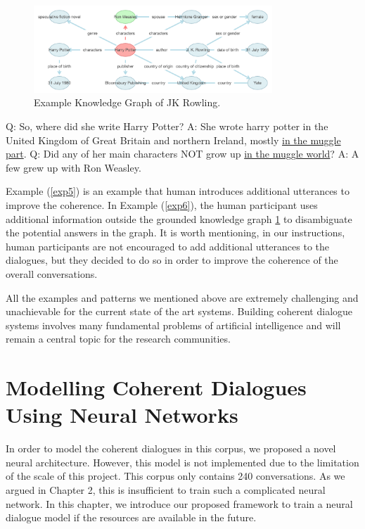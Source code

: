 \documentclass[bsc,frontabs,twoside,singlespacing,parskip,deptreport]{infthesis}     %
\begin{document}
\begin{figure}[h]
    \centering
    \includegraphics[width=0.8\textwidth]{jk.png}
    \caption{Example Knowledge Graph of JK Rowling.}
    \label{fig:jk}
\end{figure}


\begin{exe}
	\ex
	\label{exp6}
		\begin{xlist}
			\ex \label{exp3q1} Q: So, where did she write Harry Potter?
			\ex \label{exp3a1} A: She wrote harry potter in the United Kingdom of Great Britain and northern Ireland, mostly \underline{in the muggle part}.
			\ex \label{exp3q1} Q: Did any of her main characters NOT grow up \underline{in the muggle world}?
			\ex \label{exp3a1} A: A few grew up with Ron Weasley.
	\end{xlist}
\end{exe}


Example (\ref{exp5}) is an example that human introduces additional utterances to improve the coherence. In Example (\ref{exp6}), the human participant uses additional information outside the grounded knowledge graph \ref{fig:jk} to disambiguate the potential answers in the graph. It is worth mentioning, in our instructions, human participants are not encouraged to add additional utterances to the dialogues, but they decided to do so in order to improve the coherence of the overall conversations.

All the examples and patterns we mentioned above are extremely challenging and unachievable for the current state of the art systems. Building coherent dialogue systems involves many fundamental problems of artificial intelligence and will remain a central topic for the research communities.



\chapter{Modelling Coherent Dialogues Using Neural Networks}

In order to model the coherent dialogues in this corpus, we proposed a novel neural architecture. However, this model is not implemented due to the limitation of the scale of this project. This corpus only contains 240 conversations. As we argued in Chapter 2, this is insufficient to train such a complicated neural network. In this chapter, we introduce our proposed framework to train a neural dialogue model if the resources are available in the future.
\end{document}
